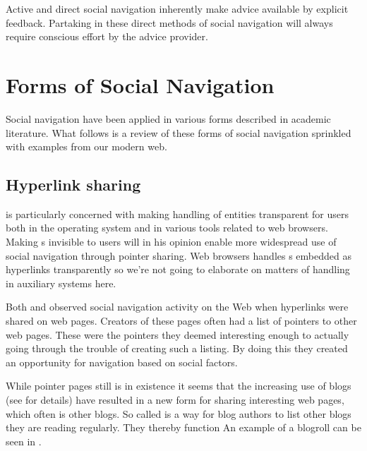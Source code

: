 Active and direct social navigation inherently make advice available by
explicit feedback. Partaking in these direct methods of social navigation
will always require conscious effort by the advice provider.

\section{Forms of Social Navigation}

Social navigation have been applied in various forms described in
academic literature. What follows is a review of these forms of social
navigation sprinkled with examples from our modern web.

\subsection{Hyperlink sharing}

\citet{dieberger97} is particularly concerned with making handling of
%
entities transparent for users both in the operating system and in various
tools related to web browsers. Making s invisible to users will in
his opinion enable more widespread use of social navigation through pointer
sharing. Web browsers handles s embedded as hyperlinks transparently
so we're not going to elaborate on matters of  handling in
auxiliary systems here.


Both \cite{dourish94} and \cite{dieberger97} observed social navigation
activity on the Web when hyperlinks were shared on web pages.
Creators of these pages often had a list of pointers to other web pages.
These were the pointers they deemed interesting enough to actually going
through the trouble of creating such a listing. By doing this they created
an opportunity for navigation based on social factors.

While pointer pages still is in existence it seems that the increasing
use of blogs (see  for details)
have resulted in a new form for sharing interesting web pages,
which often is other blogs. So called  is a way for blog
authors to list other blogs they are reading regularly. They thereby function
An example of a blogroll can be seen in .

